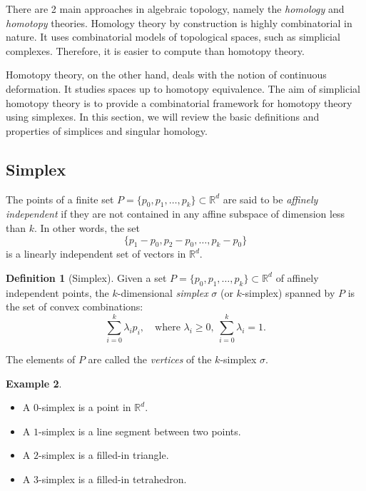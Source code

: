 \documentclass[11pt]{article}
\theoremstyle{definition}
\newtheorem{definition}{Definition}[section]
\newtheorem{example}[definition]{Example}
\theoremstyle{plain}
\begin{document}
There are 2 main approaches in algebraic topology, namely the \emph{homology} and \emph{homotopy} theories.
Homology theory by construction is highly combinatorial in nature. It uses combinatorial models of topological spaces, such as simplicial complexes. Therefore, it is easier to compute than homotopy theory.

Homotopy theory, on the other hand, deals with the notion of continuous deformation. It studies spaces up to homotopy equivalence. The aim of simplicial homotopy theory is to provide a combinatorial framework for homotopy theory using simplexes.
In this section, we will review the basic definitions and properties of simplices and singular homology.
\subsection{Simplex }

The points of a finite set $P = \{p_0, p_1, \dots, p_k\} \subset \mathbb{R}^d$ are said to be \emph{affinely independent} if they are not contained in any affine subspace of dimension less than $k$. In other words, the set
\[
    \{p_1 - p_0, p_2 - p_0, \dots, p_k - p_0\}
\]
is a linearly independent set of vectors in $\mathbb{R}^d$.

\begin{definition}[Simplex]
    Given a set $P = \{p_0, p_1, \dots, p_k\} \subset \mathbb{R}^d$ of affinely independent points, the $k$-dimensional \emph{simplex} $\sigma$ (or $k$-simplex) spanned by $P$ is the set of convex combinations:
    \[
        \sum_{i=0}^{k} \lambda_i p_i, \quad \text{where } \lambda_i \geq 0, \ \sum_{i=0}^{k} \lambda_i = 1.
    \]
\end{definition}

The elements of $P$ are called the \emph{vertices} of the $k$-simplex $\sigma$.

\begin{example}
    \leavevmode
    \begin{itemize}
        \item A $0$-simplex is a point in $\mathbb{R}^d$.
        \item A $1$-simplex is a line segment between two points.
        \item A $2$-simplex is a filled-in triangle.
        \item A $3$-simplex is a filled-in tetrahedron.
    \end{itemize}
\end{example}
\end{document}
